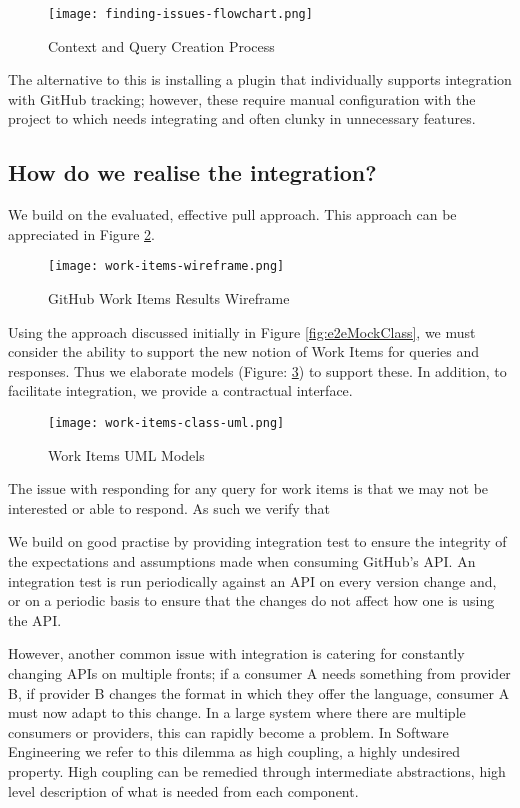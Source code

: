 \begin{figure}[h!]
	\centering
	\texttt{[image: finding-issues-flowchart.png]}
	\caption{Context and Query Creation Process}
	\label{fig:findingInformationStandardWay}
\end{figure}

The alternative to this is installing a plugin that individually supports integration with GitHub tracking; however, these require manual configuration with the project to which needs integrating and often clunky in unnecessary features.

\subsection{How do we realise the integration?}

We build on the evaluated, effective pull approach. This approach can be appreciated in Figure \ref{fig:gitHubWorkItemsWireframe}.

\begin{figure}[h!]
	\centering
	\texttt{[image: work-items-wireframe.png]}
	\caption{GitHub Work Items Results Wireframe}
	\label{fig:gitHubWorkItemsWireframe}
\end{figure}

Using the approach discussed initially in Figure \ref{fig:e2eMockClass}, we must consider the ability to support the new notion of Work Items for queries and responses. Thus we elaborate models (Figure: \ref{fig:workItemsUMLModels}) to support these. In addition, to facilitate integration, we provide a contractual interface.

\begin{figure}[h!]
	\centering
	\texttt{[image: work-items-class-uml.png]}
	\caption{Work Items UML Models}
	\label{fig:workItemsUMLModels}
\end{figure}

The issue with responding for any query for work items is that we may not be interested or able to respond. As such we verify that 

We build on good practise \parencite{gamma1995design} \parencite{martin2009clean} by providing integration test to ensure the integrity of the expectations and assumptions made when consuming GitHub's API. An integration test is run periodically against an API on every version change and, or on a periodic basis to ensure that the changes do not affect how one is using the API.

However, another common issue with integration is catering for constantly changing APIs on multiple fronts; if a consumer A needs something from provider B, if provider B changes the format in which they offer the language, consumer A must now adapt to this change. In a large system where there are multiple consumers or providers, this can rapidly become a problem. In Software Engineering we refer to this dilemma as high coupling, a highly undesired property. High coupling can be remedied through intermediate abstractions, high level description of what is needed from each component. 

